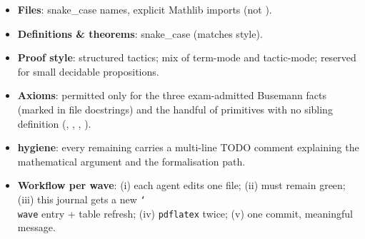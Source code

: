 \documentclass[11pt,a4paper]{article}
\theoremstyle{plain}
\theoremstyle{definition}
\begin{document}
\begin{itemize}[leftmargin=1.3em]
\item \textbf{Files}: snake\_case names, explicit Mathlib imports
      (not ).
\item \textbf{Definitions \& theorems}: snake\_case (matches
       style).
\item \textbf{Proof style}: structured tactics; mix of term-mode and
      tactic-mode;  reserved for small decidable
      propositions.
\item \textbf{Axioms}: permitted only for the three exam-admitted
      Busemann facts (marked in file docstrings) and the handful of
      primitives with no sibling definition (,
      , , ).
\item \textbf{ hygiene}: every remaining 
      carries a multi-line TODO comment explaining the mathematical
      argument and the formalisation path.
\item \textbf{Workflow per wave}: (i) each agent edits one file; (ii)
       must remain green; (iii) this journal
      gets a new \texttt{\char`\\wave} entry + table refresh; (iv)
      \texttt{pdflatex} twice; (v) one commit, meaningful message.
\end{itemize}
\end{document}
